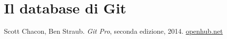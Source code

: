 \documentclass[12pt]{article}
\begin{document}
\section{Il database di Git} %

\newpage
\begin{thebibliography}{9}
	Scott Chacon, Ben Straub. \textit{Git Pro}, seconda edizione, 2014.
	\url{openhub.net}
\end{thebibliography}
\end{document}
